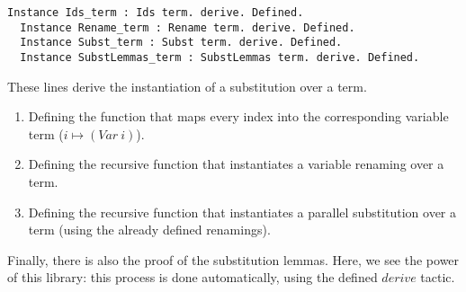 \begin{lstlisting}[language=Coq]
  Instance Ids_term : Ids term. derive. Defined.
  Instance Rename_term : Rename term. derive. Defined.
  Instance Subst_term : Subst term. derive. Defined.
  Instance SubstLemmas_term : SubstLemmas term. derive. Defined.
\end{lstlisting}

These lines derive the instantiation of a substitution over a term.
\begin{enumerate}
\item Defining the function that maps every index into the corresponding variable term ($i \mapsto (Var \ i)$).
\item Defining the recursive function that instantiates a variable renaming over a term.
\item Defining the recursive function that instantiates a parallel substitution over a term (using the already defined renamings).
\end{enumerate}

Finally, there is also the proof of the substitution lemmas. 
Here, we see the power of this library: this process is done automatically, using the defined $derive$ tactic.

